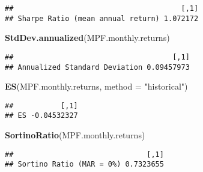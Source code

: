 \documentclass[]{article}
\newenvironment{Shaded}{\begin{snugshade}}{\end{snugshade}}
\newcommand{\DataTypeTok}[1]{\textcolor[rgb]{0.13,0.29,0.53}{#1}}
\newcommand{\KeywordTok}[1]{\textcolor[rgb]{0.13,0.29,0.53}{\textbf{#1}}}
\newcommand{\NormalTok}[1]{#1}
\newcommand{\StringTok}[1]{\textcolor[rgb]{0.31,0.60,0.02}{#1}}
\begin{document}
\begin{verbatim}
##                                       [,1]
## Sharpe Ratio (mean annual return) 1.072172
\end{verbatim}

\begin{Shaded}
\begin{Highlighting}[]
\KeywordTok{StdDev.annualized}\NormalTok{(MPF.monthly.returns)}
\end{Highlighting}
\end{Shaded}

\begin{verbatim}
##                                     [,1]
## Annualized Standard Deviation 0.09457973
\end{verbatim}

\begin{Shaded}
\begin{Highlighting}[]
\KeywordTok{ES}\NormalTok{(MPF.monthly.returns, }\DataTypeTok{method =} \StringTok{"historical"}\NormalTok{)}
\end{Highlighting}
\end{Shaded}

\begin{verbatim}
##           [,1]
## ES -0.04532327
\end{verbatim}

\begin{Shaded}
\begin{Highlighting}[]
\KeywordTok{SortinoRatio}\NormalTok{(MPF.monthly.returns)}
\end{Highlighting}
\end{Shaded}

\begin{verbatim}
##                               [,1]
## Sortino Ratio (MAR = 0%) 0.7323655
\end{verbatim}
\end{document}
